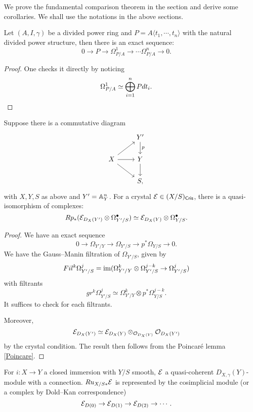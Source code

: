 We prove the fundamental comparison theorem in the section 
and derive some corollaries. 
We shall use the notations in the above sections.
\begin{lemma}
    \label{Poincare}
    Let $(A, I, \gamma)$ be a divided power ring and 
    $P = A \langle t_1, \cdots, t_n \rangle$ 
    with the natural divided power structure, 
    then there is an exact sequence:
    \[
        0 \to P \to \Omega_{P/A}^1 \to \cdots \Omega_{P/A}^n \to 0.
    \]
\end{lemma}

\begin{proof}
    One checks it directly by noticing
    \[
        \Omega_{P/A}^1 \simeq \bigoplus_{i = 1}^n Pdt_i.
        \qedhere
    \]
\end{proof}

\begin{lemma}
    \label{comparison}
    Suppose there is a commutative diagram 
    \[
        \begin{tikzcd}
            & Y'\ar[d,"p"] \\
            X \ar[r] \ar[ur] \ar[dr] & Y \ar[d] \\
            & S,
        \end{tikzcd}
    \]
    with $X, Y, S$ as above and $Y' = {\mathbb {A}}^n_Y$. 
    For a crystal ${\mathcal {E}} \in (X/S)_{\mathsf{Cris}}$, 
    there is a quasi-isomorphism of complexes:
    \[
        Rp_*({\mathcal {E}}_{D_X(Y')} \otimes \Omega_{Y'/S}^\bullet) 
        \simeq {\mathcal {E}}_{D_X(Y)} \otimes \Omega_{Y/S}^\bullet.
    \] 
\end{lemma}
\begin{proof}
    We have an exact sequence
    \[
        0 \to \Omega_{Y'/Y} \to 
        \Omega_{Y'/S} \to p^*\Omega_{Y/S} \to 0.
    \] 
    We have the Gauss--Manin filtration of $\Omega_{Y'/S}$, 
    given by 
    \[
        Fil^k\Omega_{Y'/S}^j = 
        \operatorname{im}(\Omega_{Y'/Y}^k \otimes \Omega_{Y'/S}^{j-k} \to \Omega_{Y'/S}^j)
    \]
    with filtrants 
    \[
        gr^k \Omega_{Y'/S}^j \simeq 
        \Omega_{Y'/Y}^k \otimes p^* \Omega_{Y/S}^{j-k}.
    \] 
    It suffices to check for each filtrants.

    Moreover,
    \[
        {\mathcal {E}}_{D_X(Y')} \simeq 
        {\mathcal {E}}_{D_X(Y)} \otimes_{{\mathcal {O}}_{D_X(Y)}} {\mathcal {O}}_{D_X(Y')}
    \]
    by the crystal condition. 
    The result then follows from the Poincar\'e lemma \ref{Poincare}.
\end{proof}

\begin{lemma}
    \label{Cech}
    For $i \colon X\to Y$ a closed immersion with $Y/S$ smooth, 
    ${\mathcal {E}}$ a quasi-coherent $D_{X,\gamma}(Y)$-module with a connection. 
    $Ru_{X/S*}{\mathcal {E}}$ is represented by the cosimplicial module 
    (or a complex by Dold--Kan correspondence)
    \[
        {\mathcal {E}}_{D(0)} \to {\mathcal {E}}_{D(1)} \to {\mathcal {E}}_{D(2)} \to \cdots.
    \]
\end{lemma}

